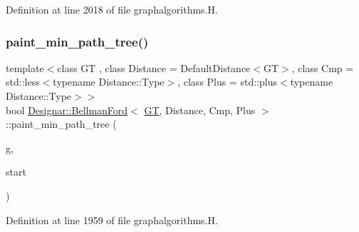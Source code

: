 Definition at line 2018 of file graphalgorithms.\+H.

\mbox{\label{class_designar_1_1_bellman_ford_a227581a852b2e97be90ac75d1aa8ad5d}} 
\subsubsection{\texorpdfstring{paint\+\_\+min\+\_\+path\+\_\+tree()}{paint\_min\_path\_tree()}}
{\footnotesize\ttfamily template$<$class GT , class Distance  = Default\+Distance$<$\+G\+T$>$, class Cmp  = std\+::less$<$typename Distance\+::\+Type$>$, class Plus  = std\+::plus$<$typename Distance\+::\+Type$>$$>$ \\
bool \hyperlink{class_designar_1_1_bellman_ford}{Designar\+::\+Bellman\+Ford}$<$ \hyperlink{demo-buildgraph_8_c_a3001c40d2c31ca87ed96cd7d1334a55e}{GT}, Distance, Cmp, Plus $>$\+::paint\+\_\+min\+\_\+path\+\_\+tree (\begin{DoxyParamCaption}\item[{\hyperlink{demo-buildgraph_8_c_a3001c40d2c31ca87ed96cd7d1334a55e}{GT} \&}]{g,  }\item[{Node \&}]{start }\end{DoxyParamCaption})\hspace{0.3cm}{\ttfamily [inline]}}



Definition at line 1959 of file graphalgorithms.\+H.

\mbox{\label{class_designar_1_1_bellman_ford_a2363c1e87c7e5ca8778a786db99fcff5}} 
